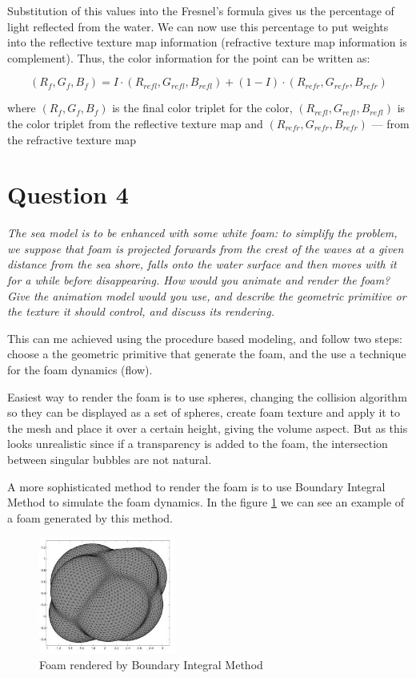 \documentclass{report}
\begin{document}
Substitution of this values into the Fresnel's formula gives us the
percentage of light reflected from the water. We can now use this
percentage to put weights into the reflective texture map information
(refractive texture map information is complement). Thus, the color
information for the point can be written as:

\begin{equation}
  (R_f,G_f,B_f) = I\cdot(R_{refl},G_{refl},B_{refl}) +
  (1-I)\cdot(R_{refr},G_{refr},B_{refr})
\end{equation}

where $(R_f,G_f,B_f)$ is the final color triplet for the color,
$(R_{refl},G_{refl},B_{refl})$ is the color triplet from the reflective
texture map and $(R_{refr},G_{refr},B_{refr})$ --- from the refractive
texture map 

\section{Question 4}

\emph{The sea model is to be enhanced with some white foam: to simplify
the problem, we suppose that foam is projected forwards from the crest
of the waves at a given distance from the sea shore, falls onto the
water surface and then moves with it for a while before disappearing.
How would you animate and render the foam? Give the animation model
would you use, and describe the geometric primitive or the texture it
should control, and discuss its rendering.}

This can me achieved using the procedure based modeling, and follow two steps: choose a the geometric primitive that generate the foam, and the use a technique for the foam dynamics (flow). 

Easiest way to render the foam is to use spheres, changing the collision
algorithm so they can be displayed as a set of spheres, create foam
texture and apply it to the mesh and place it over a certain height,
giving the volume aspect.  But as this looks unrealistic since if a
transparency is added to the foam, the intersection between singular
bubbles are not natural. 

A more sophisticated method to render the foam is to use Boundary Integral Method to simulate the foam dynamics\cite{bim}. In the figure \ref{fig:dim-foam} we can see an example of a foam generated by this method.

\begin{figure}[H] \centering
  \includegraphics[width=0.4\textwidth]{image/dim01.png} \caption{Foam
  rendered by Boundary Integral Method} \label{fig:dim-foam}
\end{figure}
\end{document}
